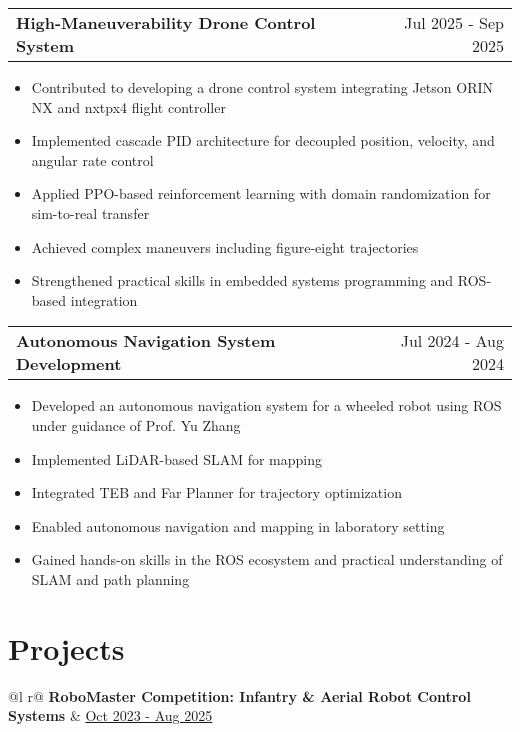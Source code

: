 \documentclass[a4paper,12pt]{article}
\makeatletter
\newenvironment{joblong}[2]
    {
    \begin{tabularx}{\linewidth}{@{}l X r@{}}
    \textbf{#1} & \hfill &  #2 \\[3.75pt]
    \end{tabularx}
    \begin{minipage}[t]{\linewidth}
    \begin{itemize}[nosep,after=\strut, leftmargin=1em, itemsep=3pt,label=--]
    }
    {
    \end{itemize}
    \end{minipage}    
    }
\makeatother
\begin{document}
\begin{joblong}{High-Maneuverability Drone Control System}{Jul 2025 - Sep 2025}
\item Contributed to developing a drone control system integrating Jetson ORIN NX and nxtpx4 flight controller
\item Implemented cascade PID architecture for decoupled position, velocity, and angular rate control
\item Applied PPO-based reinforcement learning with domain randomization for sim-to-real transfer
\item Achieved complex maneuvers including figure-eight trajectories
\item Strengthened practical skills in embedded systems programming and ROS-based integration
\end{joblong}

\begin{joblong}{Autonomous Navigation System Development}{Jul 2024 - Aug 2024}
\item Developed an autonomous navigation system for a wheeled robot using ROS under guidance of Prof. Yu Zhang
\item Implemented LiDAR-based SLAM for mapping
\item Integrated TEB and Far Planner for trajectory optimization
\item Enabled autonomous navigation and mapping in laboratory setting
\item Gained hands-on skills in the ROS ecosystem and practical understanding of SLAM and path planning
\end{joblong}
  
\section{Projects}

\begin{tabularx}{\linewidth}{ @{}l r@{} }
\textbf{RoboMaster Competition: Infantry \& Aerial Robot Control Systems} & \hfill \href{https://nightcat204.github.io/project/}{Oct 2023 - Aug 2025} \\[3.75pt]
  \\
\end{tabularx}
\end{document}
